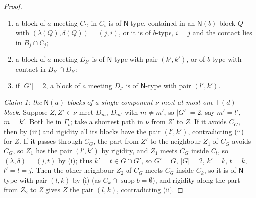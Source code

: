 \documentclass[11pt]{amsart}
\theoremstyle{definition}
\newcommand{\supp}{\operatorname{supp}}
\newcommand{\T}{\mathsf{T}}
\newcommand{\N}{\mathsf{N}}
\begin{document}
\begin{proof}
\begin{enumerate}[nosep,label=(\roman*)]
\item a block of $a$ meeting $C_G$ in $C_i$ is of $\N$-type, contained in an $\N(b)$-block $Q$ with $(\lambda(Q),\delta(Q))=(j,i)$, or it is of $b$-type, $i=j$ and the contact lies in $B_j\cap C_j$;
\item a block of $a$ meeting $D_{k'}$ is of $\N$-type with pair $(k',k')$, or of $b$-type with contact in $B_{k'}\cap D_{k'}$;
\item if $|G'|=2$, a block of $a$ meeting $D_{l'}$ is of $\N$-type with pair $(l',k')$.
\end{enumerate}

\emph{Claim 1: the $\N(a)$-blocks of a single component $\nu$ meet at most one $\T(d)$-block.} Suppose $Z,Z'\in\nu$ meet $D_m$, $D_{m'}$ with $m\ne m'$, so $|G'|=2$, say $m'=l'$, $m=k'$. Both lie in $\Gamma_t$; take a shortest path in $\nu$ from $Z'$ to $Z$. If it avoids $C_G$, then by (iii) and rigidity all its blocks have the pair $(l',k')$, contradicting (ii) for $Z$. If it passes through $C_G$, the part from $Z'$ to the neighbour $Z_1$ of $C_G$ avoids $C_G$, so $Z_1$ has the pair $(l',k')$ by rigidity, and $Z_1$ meets $C_G$ inside $C_t$, so $(\lambda,\delta)=(j,t)$ by (i); thus $k'=t\in G\cap G'$, so $G'=G$, $|G|=2$, $k'=k$, $t=k$, $l'=l=j$. Then the other neighbour $Z_2$ of $C_G$ meets $C_G$ inside $C_k$, so it is of $\N$-type with pair $(l,k)$ by (i) (as $C_k\cap\supp b=\emptyset$), and rigidity along the part from $Z_2$ to $Z$ gives $Z$ the pair $(l,k)$, contradicting (ii).


\end{proof}
\end{document}
